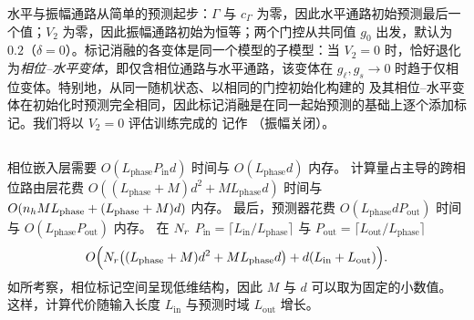 {
水平与振幅通路从简单的预测起步：$\Gamma$ 与 $c_\Gamma$ 为零，因此水平通路初始预测最后一个值；$V_2$ 为零，因此振幅通路初始为恒等；两个门控从共同值 $g_0$ 出发，默认为 $0.2$（$\delta=0$）。标记消融的各变体是同一个模型的子模型：当 $V_2=0$ 时，\sysplus 恰好退化为\emph{相位–水平变体}，即仅含相位通路与水平通路，该变体在 $g_\ell,g_s\to0$ 时趋于仅相位变体。特别地，从同一随机状态、以相同的门控初始化构建的 \sysplus 及其相位–水平变体在初始化时预测完全相同，因此标记消融是在同一起始预测的基础上逐个添加标记。我们将以 $V_2=0$ 评估训练完成的 \sysplus 记作 \sysplus（振幅关闭）。
}

\subsection{}
\label{sec:complexity}

相位嵌入层需要 $O(L_{\text{phase}} P_{\text{in}} d)$ 时间与 $O(L_{\text{phase}} d)$ 内存。
计算量占主导的跨相位路由层花费 $O((L_{\text{phase}}+M)d^2 + M L_{\text{phase}} d)$ 时间与 $O(n_h M L_{\text{phase}} + (L_{\text{phase}}+M)d)$ 内存。
最后，预测器花费 $O(L_{\text{phase}} d P_{\text{out}})$ 时间与 $O(L_{\text{phase}} P_{\text{out}})$ 内存。
在 $N_r$  $P_{\text{in}}=\lceil L_{\text{in}}/L_{\text{phase}}\rceil$ 与
$P_{\text{out}}=\lceil L_{\text{out}}/L_{\text{phase}}\rceil$
\[
O\Big(N_r\big((L_{\text{phase}}+M)d^2 + M L_{\text{phase}} d\big)
+ d(L_{\text{in}}+L_{\text{out}})\Big).
\]
如所考察，相位标记空间呈现低维结构，因此 $M$ 与 $d$ 可以取为固定的小数值。
这样，计算代价随输入长度 $L_{\text{in}}$ 与预测时域 $L_{\text{out}}$ 增长。

